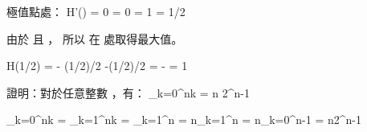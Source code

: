 極值點處：
\startformula\startmathalignment[n=1]
\NC H'(\lambda) = 0 \NR
\NC \Downarrow \NR
\NC \lg{} = 0 \NR
\NC \Downarrow \NR
\NC {} = 1 \NR
\NC \Downarrow \NR
\NC \lambda = 1/2 \NR
\stopmathalignment\stopformula

由於  且 ，
所以  在  處取得最大值。

\startformula
H(1/2) = - \lg(1/2)/2 -\lg(1/2)/2 = -  = 1
\stopformula
\stopANSWER

\startEXERCISE\DIFFICULT
證明：對於任意整數 ，有：
\startformula
\sum_{k=0}^{n}k = n 2^{n-1}
\stopformula
\stopEXERCISE

\startANSWER
\startformula\startmathalignment
\NC \sum_{k=0}^nk
   \NC = \sum_{k=1}^nk \NR
\NC \NC = \sum_{k=1}^n \NR
\NC \NC = n\sum_{k=1}^n \NR
\NC \NC = n\sum_{k=0}^{n-1} \NR
\NC \NC = n2^{n-1} \NR
\stopmathalignment\stopformula
\stopANSWER

\stopsection
